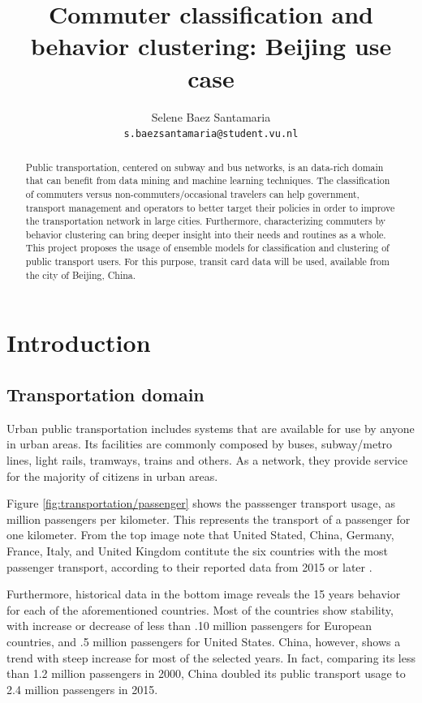 \documentclass{article}
\title{Commuter classification and behavior clustering: Beijing use case}
\author{
  Selene Baez  Santamaria \\
  \texttt{s.baezsantamaria@student.vu.nl}
}
\begin{document}

\maketitle

\begin{abstract}
  Public transportation, centered on subway and bus networks, is an data-rich domain that can benefit from data mining and machine learning techniques. The classification of commuters versus non-commuters/occasional travelers can help government, transport management and operators to better target their policies in order to improve the transportation network in large cities. Furthermore, characterizing commuters by behavior clustering can bring deeper insight into their needs and routines as a whole. 
  This project proposes the usage of ensemble models for classification and clustering of public transport users. For this purpose, transit card data will be used, available from the city of Beijing, China. 
\end{abstract}

\newpage

\tableofcontents

\newpage
\section{Introduction}

\subsection{Transportation domain}
Urban public transportation includes systems that are available for use by anyone in urban areas. Its facilities are commonly composed by buses, subway/metro lines, light rails, tramways, trains and others. As a network, they provide service for the majority of citizens in urban areas. \citep{vuchic1900urban}

Figure \ref{fig:transportation/passenger} shows the passsenger transport usage, as million passengers per kilometer. This represents the transport of a passenger for one kilometer. From the top image note that United Stated, China, Germany, France, Italy, and United Kingdom contitute the six countries with the most passenger transport, according to their reported data from 2015 or later \cite{OECD2017passenger}. 

Furthermore, historical data in the bottom image reveals the 15 years behavior for each of the aforementioned countries. Most of the countries show stability, with increase or decrease of less than .10 million passengers for European countries, and .5 million passengers for United States. China, however, shows a trend with steep increase for most of the selected years. In fact, comparing its less than 1.2 million passengers in 2000, China doubled its public transport usage to 2.4 million passengers in 2015. 
\end{document}
